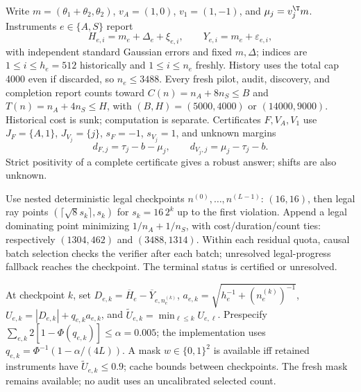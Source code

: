 Write $m=(\theta_1+\theta_2,\theta_2)$, $v_A=(1,0)$, $v_1=(1,-1)$, and $\mu_j=v_j^\T m$. Instruments $e\in\{A,S\}$ report
$$H_{e,i}=m_e+\Delta_e+\xi_{e,i},\qquad Y_{e,i}=m_e+\varepsilon_{e,i},$$
with independent standard Gaussian errors and fixed $m,\Delta$; indices are $1\leq i\leq h_e=512$ historically and $1\leq i\leq n_e$ freshly. History uses the total cap 4000 even if discarded, so $n_e\leq3488$. Every fresh pilot, audit, discovery, and completion report counts toward $C(n)=n_A+8n_S\leq B$ and $T(n)=n_A+4n_S\leq H$, with $(B,H)=(5000,4000)$ or $(14000,9000)$. Historical cost is sunk; computation is separate.
Certificates $F,V_A,V_1$ use $J_F=\{A,1\}$, $J_{V_j}=\{j\}$, $s_F=-1$, $s_{V_j}=1$, and unknown margins
$$d_{F,j}=\tau_j-b-\mu_j,\qquad d_{V_j,j}=\mu_j-\tau_j-b.$$
Strict positivity of a complete certificate gives a robust answer; shifts are also unknown.

Use nested deterministic legal checkpoints $n^{(0)},\ldots,n^{(L-1)}$: $(16,16)$, then legal ray points $(\lceil\sqrt8s_k\rceil,s_k)$ for $s_k=16\,2^k$ up to the first violation. Append a legal dominating point minimizing $1/n_A+1/n_S$, with cost/duration/count ties: respectively $(1304,462)$ and $(3488,1314)$. Within each residual quota, causal batch selection checks the verifier after each batch; unresolved legal-progress fallback reaches the checkpoint. The terminal status is certified or unresolved.

At checkpoint $k$, set $D_{e,k}=\overline H_e-\overline Y_{e,n_e^{(k)}}$, $a_{e,k}=\sqrt{h_e^{-1}+(n_e^{(k)})^{-1}}$, $U_{e,k}=|D_{e,k}|+q_{e,k}a_{e,k}$, and $\widetilde U_{e,k}=\min_{\ell\leq k}U_{e,\ell}$. Prespecify $\sum_{e,k}2[1-\Phi(q_{e,k})]\leq\alpha=0.005$; the implementation uses $q_{e,k}=\Phi^{-1}(1-\alpha/(4L))$. A mask $w\in\{0,1\}^2$ is available iff retained instruments have $\widetilde U_{e,k}\leq0.9$; cache bounds between checkpoints. The fresh mask remains available; no audit uses an uncalibrated selected count.

